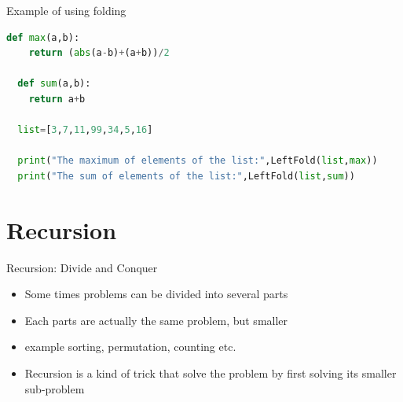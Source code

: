 \documentclass[10pt,xcolor={table,dvipsnames},t]{beamer}
\begin{document}
\begin{frame}[fragile]{Example of using folding}
\begin{lstlisting}[language=python]
  def max(a,b):
    return (abs(a-b)+(a+b))/2
  
  def sum(a,b):
    return a+b
  
  list=[3,7,11,99,34,5,16]

  print("The maximum of elements of the list:",LeftFold(list,max))
  print("The sum of elements of the list:",LeftFold(list,sum))
\end{lstlisting}
\end{frame}

\section{Recursion}

\begin{frame}[fragile]{Recursion: Divide and Conquer}
  \begin{itemize}
    \item Some times problems can be divided into several parts
    \item Each parts are actually the same problem, but smaller
    \item example sorting, permutation, counting etc.
    \item Recursion is a kind of trick that solve the problem by first solving its smaller sub-problem
  \end{itemize}
\end{frame}
\end{document}
